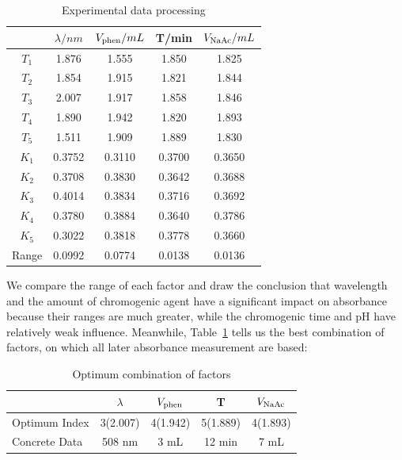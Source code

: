 \documentclass[journal=jacsat,manuscript=article]{achemso}
\begin{document}
\begin{table}[H]
    \caption{Experimental data processing}
    \label{Tab.OrtPro}
    \begin{tabular}{ccccc}
    \toprule
    & $\lambda /nm$ & $V_{\ce{phen}}/mL$ & T/min & $V_{\ce{NaAc}}/mL$\\
    \midrule
    $T_1$ & 1.876 & 1.555 & 1.850 & 1.825 \\
    $T_2$ & 1.854 & 1.915 & 1.821 & 1.844 \\
    $T_3$ & 2.007 & 1.917 & 1.858 & 1.846 \\
    $T_4$ & 1.890 & 1.942 & 1.820 & 1.893 \\
    $T_5$ & 1.511 & 1.909 & 1.889 & 1.830 \\
    $K_1$ & 0.3752 & 0.3110 & 0.3700 & 0.3650 \\
    $K_2$ & 0.3708 & 0.3830 & 0.3642 & 0.3688 \\
    $K_3$ & 0.4014 & 0.3834 & 0.3716 & 0.3692 \\
    $K_4$ & 0.3780 & 0.3884 & 0.3640 & 0.3786 \\
    $K_5$ & 0.3022 & 0.3818 & 0.3778 & 0.3660 \\
    Range & 0.0992 & 0.0774 & 0.0138 & 0.0136 \\
    \bottomrule
    \end{tabular}
\end{table}
We compare the range of each factor and draw the conclusion that wavelength and the amount of chromogenic agent have a significant impact on absorbance because their ranges are much greater, while the chromogenic time and pH have relatively weak influence. Meanwhile, Table~\ref{Tab.OrtPro} tells us the best combination of factors, on which all later absorbance measurement are based:

\begin{table}[H]
    \caption{Optimum combination of factors}
    \label{tab.Opt}
    \begin{tabular}{lcccc}
    \toprule
    & $\lambda$ & $V_{\ce{phen}}$ & T & $V_{\ce{NaAc}}$\\
    \midrule
    Optimum Index & 3(2.007) & 4(1.942) & 5(1.889) & 4(1.893)\\
    Concrete Data & 508 nm   & 3 mL     & 12 min   & 7 mL    \\
    \bottomrule
    \end{tabular}
\end{table}
\end{document}
